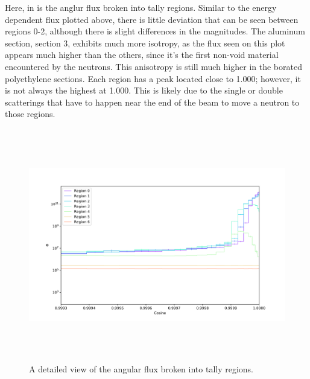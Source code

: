 Here, in  is the anglur flux broken into tally regions.
Similar to the energy dependent flux plotted above, there is little deviation that can be seen between regions 0-2, although there is slight differences in the magnitudes.
The aluminum section, section 3, exhibits much more isotropy, as the flux seen on this plot appears much higher than the others, since it's the first non-void material encountered by the neutrons.
This anisotropy is still much higher in the borated polyethylene sections.
Each region has a peak located close to 1.000; however, it is not always the highest at 1.000.
This is likely due to the single or double scatterings that have to happen near the end of the beam to move a neutron to those regions.


\begin{figure}[htb]
\centering
\includegraphics[height=4in]{tex/figures/flux_rad_cos_detail.png}
\caption[Detailed Regional Flux vs. Angle]{A detailed view of the angular flux broken into tally regions.}
\label{fig:flux_rad_cos_detail}
\end{figure}

